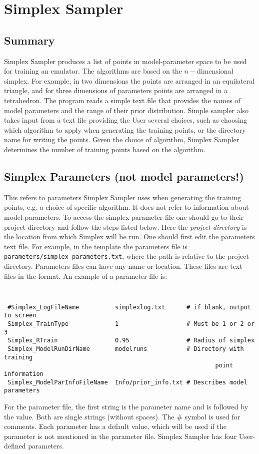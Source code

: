 \documentclass[main.tex]{subfiles}
\begin{document}
\setcounter{section}{2}

\section{Simplex Sampler}\label{sec:simplex}

\subsection{Summary}
Simplex Sampler produces a list of points in model-parameter space to be used for training an emulator. The algorithms are based on the $n-$dimensional simplex. For example, in two dimensions the points are arranged in an equilateral triangle, and for three dimensions of parameters points are arranged in a tetrahedron. The program reads a simple text file that provides the names of model parameters and the range of their prior distribution. Simple sampler also takes input from a text file providing the User several choices, such as choosing which algorithm to apply when generating the training points, or the directory name for writing the points. Given the choice of algorithm, Simplex Sampler determines the number of training points based on the algorithm.

\subsection{Simplex Parameters (not model parameters!)}

This refers to parameters Simplex Sampler uses when generating the training points, e.g. a choice of specific algorithm. It does not refer to information about model parameters. To access the simplex parameter file one should go to their project directory and follow the steps listed below. Here the {\it project directory} is the location from which Simplex will be run. One should first edit the parameters text file. For example, in the template the parameters file is {\tt parameters/simplex\_parameters.txt}, where the path is relative to the project directory.
Parameters files can have any name or location. These files are text files in the format. An example of a parameter file is:
{\tt
\begin{verbatim}
 #Simplex_LogFileName          simplexlog.txt      # if blank, output to screen
 Simplex_TrainType             1                   # Must be 1 or 2 or 3
 Simplex_RTrain                0.95                # Radius of simplex
 Simplex_ModelRunDirName       modelruns           # Directory with training
                                                           point information
 Simplex_ModelParInfoFileName  Info/prior_info.txt # Describes model parameters
\end{verbatim}
}
For the parameter file, the first string is the parameter name and is followed by the value. Both are single strings (without spaces). The \# symbol is used for comments. Each parameter has a default value, which will be used if the parameter is not mentioned in the parameter file.  Simplex Sampler has four User-defined parameters.
    
\end{document}

